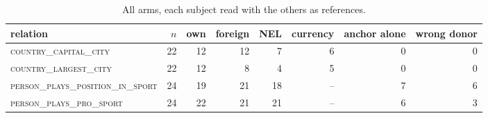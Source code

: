 \begin{table}[t]
\centering
\caption{All arms, each subject read with the others as references.}
\label{tab:swapfull}
\begin{tabular}{lrrrrrrr}
\toprule
relation & $n$ & own & foreign & NEL & currency & anchor alone & wrong donor \\
\midrule
\textsc{country\_capital\_city} & 22 & 12 & 12 & 7 & 6 & 0 & 0 \\
\textsc{country\_largest\_city} & 22 & 12 & 8 & 4 & 5 & 0 & 0 \\
\textsc{person\_plays\_position\_in\_sport} & 24 & 19 & 21 & 18 & -- & 7 & 6 \\
\textsc{person\_plays\_pro\_sport} & 24 & 22 & 21 & 21 & -- & 6 & 3 \\
\bottomrule
\end{tabular}
\end{table}
